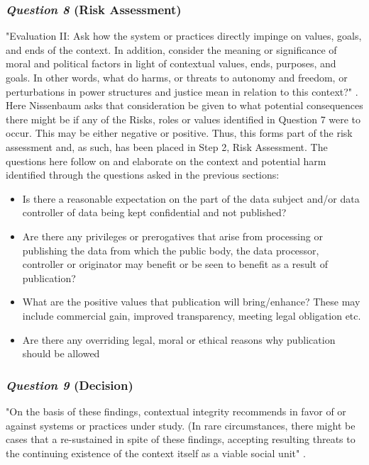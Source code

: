 \subsubsection {{\it Question 8} {\bf(Risk Assessment)}}
"Evaluation II: Ask how the system or practices directly impinge on values, goals, and ends of the context. In addition, consider the meaning or significance of moral and political factors in light of contextual values, ends, purposes, and goals. In other words, what do harms, or threats to autonomy and freedom, or perturbations in power structures and justice mean in relation to this context?" \citep{Nissenbaum_2010}.\\

Here Nissenbaum asks that consideration be given to what potential consequences there might be if any of the Risks, roles or values identified in Question 7 were to occur. This may be either negative or positive.  Thus, this forms part of the risk assessment and, as such, has been placed in Step 2, Risk Assessment. The questions here follow on and elaborate on the context and potential harm identified through the questions asked in the previous sections: 
\begin{itemize}
\item Is there a reasonable expectation on the part of the data subject and/or data controller of data being kept confidential and not published?
\item Are there any privileges or prerogatives that arise from processing or publishing the data from which the public body, the data processor, controller or originator may benefit or be seen to benefit as a result of publication?
\item What are the positive values that publication will bring/enhance? These may include commercial gain, improved transparency, meeting legal obligation etc.
\item Are there any overriding legal, moral or ethical reasons why publication should be allowed 
\end{itemize}
\subsubsection {{\it Question 9} {\bf(Decision)}}
"On the basis of these findings, contextual integrity recommends in favor of or against systems or practices under study. (In rare circumstances, there might be cases that a re-sustained in spite of these findings, accepting resulting threats to the continuing existence of the context itself as a viable social unit"  \citep{Nissenbaum_2010}.\\

